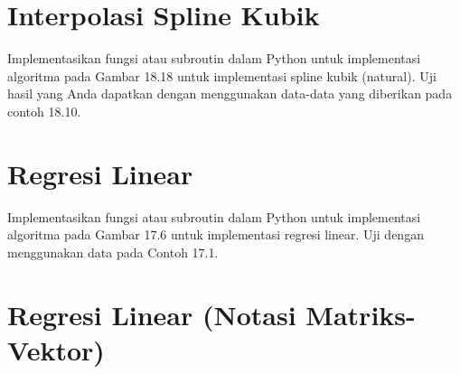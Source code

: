 \section{Interpolasi Spline Kubik}
\begin{soal}
Implementasikan fungsi atau subroutin dalam Python untuk implementasi algoritma
pada Gambar 18.18 untuk implementasi spline kubik (natural).
Uji hasil yang Anda dapatkan dengan menggunakan data-data yang diberikan pada contoh
18.10.
\end{soal}


\section{Regresi Linear}
\begin{soal}
Implementasikan fungsi atau subroutin dalam Python untuk implementasi algoritma
pada Gambar 17.6 untuk implementasi regresi linear. Uji dengan menggunakan data
pada Contoh 17.1.
\end{soal}

\section{Regresi Linear (Notasi Matriks-Vektor)}

